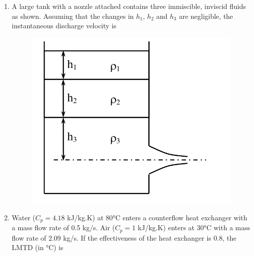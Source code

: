 \documentclass[journal,12pt,onecolumn]{IEEEtran}
\begin{document}
\begin{enumerate}[resume]
    \item A large tank with a nozzle attached contains three immiscible, inviscid fluids as shown. Assuming that the changes in \(h_1\), \(h_2\) and \(h_3\) are negligible, the instantaneous discharge velocity is
          \begin{figure}[H]
              \centering
              \includegraphics[scale=0.2]{q40}
              \caption{}
              \label{q40}
          \end{figure}

          \begin{enumerate}
          \end{enumerate}

    \item Water (\(C_p = 4.18\) kJ/kg.K) at 80°C enters a counterflow heat exchanger with a mass flow rate of 0.5 kg/s. Air (\(C_p = 1\) kJ/kg.K) enters at 30°C with a mass flow rate of 2.09 kg/s. If the effectiveness of the heat exchanger is 0.8, the LMTD (in °C) is


\end{enumerate}
\end{document}
